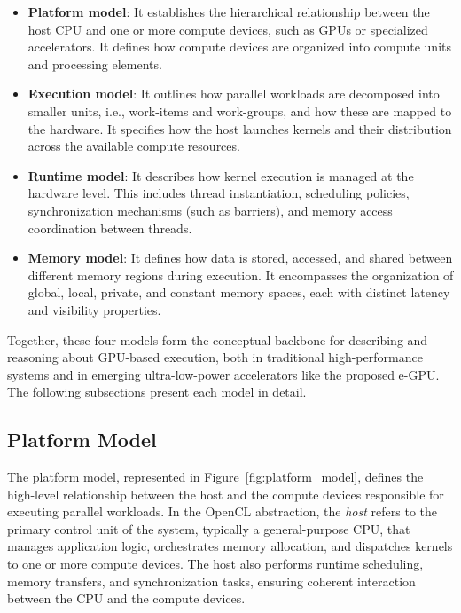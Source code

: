         \vspace{-1em}
        \begin{itemize}
            \item \textbf{Platform model}: It establishes the hierarchical relationship between the host CPU and one or more compute devices, such as GPUs or specialized accelerators. It defines how compute devices are organized into compute units and processing elements.
            
            \item \textbf{Execution model}: It outlines how parallel workloads are decomposed into smaller units, i.e., work-items and work-groups, and how these are mapped to the hardware. It specifies how the host launches kernels and their distribution across the available compute resources.
            
            \item \textbf{Runtime model}: It describes how kernel execution is managed at the hardware level. This includes thread instantiation, scheduling policies, synchronization mechanisms (such as barriers), and memory access coordination between threads.
        
            \item \textbf{Memory model}: It defines how data is stored, accessed, and shared between different memory regions during execution. It encompasses the organization of global, local, private, and constant memory spaces, each with distinct latency and visibility properties.
        \end{itemize}
        \vspace{-1em}
        
        Together, these four models form the conceptual backbone for describing and reasoning about GPU-based execution, both in traditional high-performance systems and in emerging ultra-low-power accelerators like the proposed \mbox{e-GPU}. The following subsections present each model in detail.

        \vspace{-1em}
        \subsection{Platform Model}
        
            The platform model, represented in Figure~\ref{fig:platform_model}, defines the high-level relationship between the host and the compute devices responsible for executing parallel workloads. In the OpenCL abstraction, the \emph{host} refers to the primary control unit of the system, typically a general-purpose CPU, that manages application logic, orchestrates memory allocation, and dispatches kernels to one or more compute devices. The host also performs runtime scheduling, memory transfers, and synchronization tasks, ensuring coherent interaction between the CPU and the compute devices.

